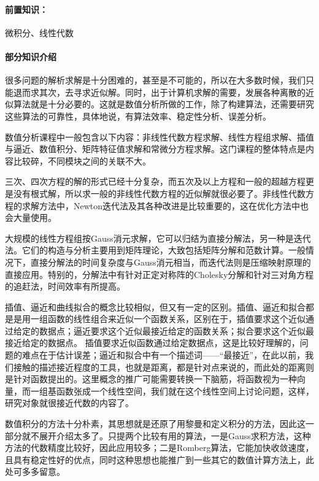 \paragraph{前置知识：}微积分、线性代数

\paragraph{部分知识介绍}

很多问题的解析求解是十分困难的，甚至是不可能的，所以在大多数时候，我们只能退而求其次，去寻求近似解。同时，出于计算机求解的需要，发展各种离散的近似算法就是十分必要的。这就是数值分析所做的工作，除了构建算法，还需要研究这些算法的可靠性，具体地说，有算法效率、稳定性分析、误差分析。

数值分析课程中一般包含以下内容：非线性代数方程求解、线性方程组求解、插值与逼近、数值积分、矩阵特征值求解和常微分方程求解。这门课程的整体特点是内容比较碎，不同模块之间的关联不大。

三次、四次方程的解的形式已经十分复杂，而五次及以上方程和一般的超越方程更是没有根式解，所以求一般的非线性代数方程的近似解就很必要了。非线性代数方程的求解方法中，Newton迭代法及其各种改进是比较重要的，这在优化方法中也会大量使用。

大规模的线性方程组按Gauss消元求解，它可以归结为直接分解法，另一种是迭代法。它们的构造与分析主要用到矩阵理论，大致包括矩阵分解和范数计算。一般情况下，直接分解法的时间复杂度与Gauss消元相当，而迭代法则是压缩映射原理的直接应用。特别的，分解法中有针对正定对称阵的Cholesky分解和针对三对角方程的追赶法，时间效率有所提高。

插值、逼近和曲线拟合的概念比较相似，但又有一定的区别。插值、逼近和拟合都是是用一组函数的线性组合来近似一个函数关系，区别在于，插值要求这个近似通过给定的数据点；逼近要求这个近似最接近给定的函数关系；拟合要求这个近似最接近给定的数据点。%
插值要求近似函数通过给定数据点，这是比较好理解的，问题的难点在于估计误差；逼近和拟合中有一个描述词——“最接近”，在此以前，我们接触的描述接近程度的工具，也就是距离，都是针对点来说的，而此处的距离则是针对函数提出的。这里概念的推广可能需要转换一下脑筋，将函数视为一种向量，而一组基函数张成一个线性空间，我们就在这个线性空间上讨论问题，这样，研究对象就很接近代数的内容了。

数值积分的方法十分朴素，其思想就是还原了用黎曼和定义积分的方法，因此这一部分就不展开介绍太多了。只提两个比较有用的算法，一是Gauss求积方法，这种方法的代数精度比较好，因此应用较多；二是Romberg算法，它能加快收敛速度，且具有稳定性好的优点，同时这种思想也能推广到一些其它的数值计算方法上，此处可多多留意。


